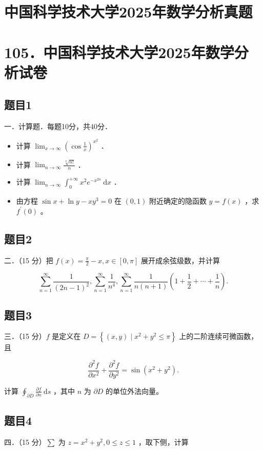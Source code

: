 \documentclass{article}
\begin{document}
\section*{中国科学技术大学2025年数学分析真题}
\section*{105．中国科学技术大学2025年数学分析试卷}

\subsection{题目1}
一．计算题．每题10分，共40分．

\begin{itemize}
  \item[（1）] 计算 \(\lim _{x \rightarrow \infty}\left(\cos \frac{1}{x}\right)^{x^{2}}\) ．
  \item[（2）] 计算 \(\lim _{n \rightarrow \infty} \frac{\sqrt[n]{n!}}{n}\) ．
  \item[（3）] 计算 \(\lim _{n \rightarrow \infty} \int_{0}^{+\infty} x^{2} e^{-x^{2 n}} \mathrm{~d} x\) ．
  \item[（4）] 由方程 \(\sin x+\ln y-x y^{3}=0\) 在 \((0,1)\) 附近确定的隐函数 \(y=f(x)\) ，求 \(f^{\prime}(0)\) 。
\end{itemize}

\subsection{题目2}
二．（15 分）把 \(f(x)=\frac{\pi}{2}-x, x \in[0, \pi]\) 展开成余弦级数，并计算

\[
\sum_{n=1}^{\infty} \frac{1}{(2 n-1)^{2}}, \sum_{n=1}^{\infty} \frac{1}{n^{4}}, \sum_{n=1}^{\infty} \frac{1}{n(n+1)}\left(1+\frac{1}{2}+\cdots+\frac{1}{n}\right) .
\]

\subsection{题目3}
三．（15 分）\(f\) 是定义在 \(D=\left\{(x, y) \mid x^{2}+y^{2} \leq \pi\right\}\) 上的二阶连续可微函数，且

\[
\frac{\partial^{2} f}{\partial x^{2}}+\frac{\partial^{2} f}{\partial y^{2}}=\sin \left(x^{2}+y^{2}\right) .
\]

计算 \(\oint_{\partial D} \frac{\partial f}{\partial n} \mathrm{~d} s\) ，其中 \(n\) 为 \(\partial D\) 的单位外法向量。

\subsection{题目4}
四．（15 分）\(\sum\) 为 \(z=x^{2}+y^{2}, 0 \leq z \leq 1\) ，取下侧，计算
\end{document}
